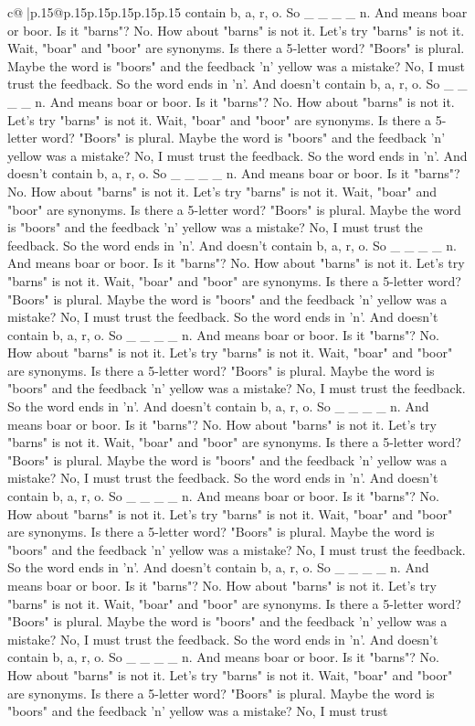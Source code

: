 \documentclass{article}
\begin{document}
{\begin{supertabular}{c@{$\;$}|p{.15\linewidth}@{}p{.15\linewidth}p{.15\linewidth}p{.15\linewidth}p{.15\linewidth}p{.15\linewidth}}
{{{contain b, a, r, o. So \_ \_ \_ \_ n. And means boar or boor. Is it "barns"? No. How about "barns" is not it. Let's try "barns" is not it. Wait, "boar" and "boor" are synonyms. Is there a 5{-}letter word? "Boors" is plural. Maybe the word is "boors" and the feedback 'n' yellow was a mistake? No, I must trust the feedback. So the word ends in 'n'. And doesn't contain b, a, r, o. So \_ \_ \_ \_ n. And means boar or boor. Is it "barns"? No. How about "barns" is not it. Let's try "barns" is not it. Wait, "boar" and "boor" are synonyms. Is there a 5{-}letter word? "Boors" is plural. Maybe the word is "boors" and the feedback 'n' yellow was a mistake? No, I must trust the feedback. So the word ends in 'n'. And doesn't contain b, a, r, o. So \_ \_ \_ \_ n. And means boar or boor. Is it "barns"? No. How about "barns" is not it. Let's try "barns" is not it. Wait, "boar" and "boor" are synonyms. Is there a 5{-}letter word? "Boors" is plural. Maybe the word is "boors" and the feedback 'n' yellow was a mistake? No, I must trust the feedback. So the word ends in 'n'. And doesn't contain b, a, r, o. So \_ \_ \_ \_ n. And means boar or boor. Is it "barns"? No. How about "barns" is not it. Let's try "barns" is not it. Wait, "boar" and "boor" are synonyms. Is there a 5{-}letter word? "Boors" is plural. Maybe the word is "boors" and the feedback 'n' yellow was a mistake? No, I must trust the feedback. So the word ends in 'n'. And doesn't contain b, a, r, o. So \_ \_ \_ \_ n. And means boar or boor. Is it "barns"? No. How about "barns" is not it. Let's try "barns" is not it. Wait, "boar" and "boor" are synonyms. Is there a 5{-}letter word? "Boors" is plural. Maybe the word is "boors" and the feedback 'n' yellow was a mistake? No, I must trust the feedback. So the word ends in 'n'. And doesn't contain b, a, r, o. So \_ \_ \_ \_ n. And means boar or boor. Is it "barns"? No. How about "barns" is not it. Let's try "barns" is not it. Wait, "boar" and "boor" are synonyms. Is there a 5{-}letter word? "Boors" is plural. Maybe the word is "boors" and the feedback 'n' yellow was a mistake? No, I must trust the feedback. So the word ends in 'n'. And doesn't contain b, a, r, o. So \_ \_ \_ \_ n. And means boar or boor. Is it "barns"? No. How about "barns" is not it. Let's try "barns" is not it. Wait, "boar" and "boor" are synonyms. Is there a 5{-}letter word? "Boors" is plural. Maybe the word is "boors" and the feedback 'n' yellow was a mistake? No, I must trust the feedback. So the word ends in 'n'. And doesn't contain b, a, r, o. So \_ \_ \_ \_ n. And means boar or boor. Is it "barns"? No. How about "barns" is not it. Let's try "barns" is not it. Wait, "boar" and "boor" are synonyms. Is there a 5{-}letter word? "Boors" is plural. Maybe the word is "boors" and the feedback 'n' yellow was a mistake? No, I must trust the feedback. So the word ends in 'n'. And doesn't contain b, a, r, o. So \_ \_ \_ \_ n. And means boar or boor. Is it "barns"? No. How about "barns" is not it. Let's try "barns" is not it. Wait, "boar" and "boor" are synonyms. Is there a 5{-}letter word? "Boors" is plural. Maybe the word is "boors" and the feedback 'n' yellow was a mistake? No, I must trust }}}
\end{supertabular}}
\end{document}

